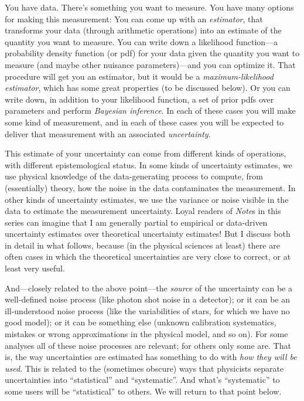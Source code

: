 \documentclass[10pt]{article}
\newcommand{\documentname}{\textsl{Note}}
\begin{document}
You have data. There's something you want to measure. You have many
options for making this measurement: You can come up with an
\textsl{estimator}, that transforms your data (through arithmetic
operations) into an estimate of the quantity you want to measure. You
can write down a likelihood function---a probability density function
(or pdf) for your data given the quantity you want to measure (and
maybe other nuisance parameters)---and you can optimize it. That
procedure will get you an estimator, but it would be a
\textsl{maximum-likelihood estimator}, which has some great
properties (to be discussed below).
Or you can write down, in addition to your likelihood
function, a set of prior pdfs over parameters and perform
\textsl{Bayesian inference}.  In each of these cases you will make
some kind of measurement, and in each of these cases you will be
expected to deliver that measurement with an associated \textsl{uncertainty}.

This estimate of your uncertainty can come from different kinds of operations, with
different epistemological status. In some kinds of uncertainty
estimates, we use physical knowledge of the data-generating process to
compute, from (essentially) theory, how the noise in the data
contaminates the measurement. In other kinds of uncertainty estimates,
we use the variance or noise visible in the data to estimate the measurement
uncertainty. Loyal readers of \documentname s in this series can imagine that
I am generally partial to empirical or data-driven uncertainty estimates over
theoretical uncertainty estimates! But I discuss both in detail in what follows,
because (in the physical sciences at least) there are often cases in which the
theoretical uncertainties are very close to correct, or at least very useful.

And---closely related to the above point---the \emph{source} of the
uncertainty can be a well-defined noise process (like photon shot
noise in a detector); or it can be an ill-understood noise process
(like the variabilities of stars, for which we have no good model); or
it can be something else (unknown calibration systematics, mistakes or
wrong approximations in the physical model, and so on). For some analyses
all of these noise processes are relevant; for others only some are.
That is, the way uncertainties are estimated has something to do with
\emph{how they will be used}. This is related to the (sometimes obscure)
ways that physicists separate uncertainties into ``statistical'' and ``systematic''.
And what's ``systematic'' to some users will be ``statistical'' to others.
We will return to that point below.
\end{document}
